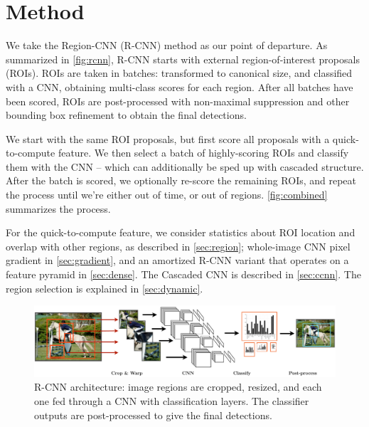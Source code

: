 \section{Method}\label{sec:method}

We take the Region-CNN (R-CNN) \cite{Girshick-CVPR-2014} method as our point of departure.
As summarized in \autoref{fig:rcnn}, R-CNN starts with external region-of-interest proposals (ROIs).
ROIs are taken in batches: transformed to canonical size, and classified with a CNN, obtaining multi-class scores for each region.
After all batches have been scored, ROIs are post-processed with non-maximal suppression and other bounding box refinement to obtain the final detections.

We start with the same ROI proposals, but first score all proposals with a quick-to-compute feature.
We then select a batch of highly-scoring ROIs and classify them with the CNN -- which can additionally be sped up with cascaded structure.
After the batch is scored, we optionally re-score the remaining ROIs, and repeat the process until we're either out of time, or out of regions.
\autoref{fig:combined} summarizes the process.

For the quick-to-compute feature, we consider statistics about ROI location and overlap with other regions, as described in \autoref{sec:region}; whole-image CNN pixel gradient in \autoref{sec:gradient}, and an amortized R-CNN variant that operates on a feature pyramid in \autoref{sec:dense}.
The Cascaded CNN is described in \autoref{sec:ccnn}.
The region selection is explained in \autoref{sec:dynamic}.

\begin{figure}[h!]
\begin{center}
\includegraphics[width=0.98\columnwidth]{figures/rcnn.pdf}
\caption{
R-CNN architecture: image regions are cropped, resized, and each one fed through a CNN with classification layers.
The classifier outputs are post-processed to give the final detections.
}\label{fig:rcnn}
\end{center}
\end{figure}


